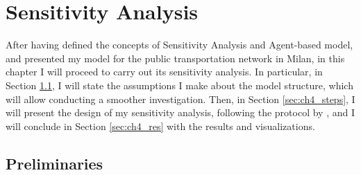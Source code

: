 \chapter{Sensitivity Analysis} \label{ch:sa}


        
After having defined the concepts of Sensitivity Analysis and Agent-based model, and presented my model for the public transportation network in Milan, in this chapter I will proceed to carry out its sensitivity analysis. In particular, in Section \ref{sec:ch4_pre}, I will state the assumptions I make about the model structure, which will allow conducting a smoother investigation. Then, in Section \ref{sec:ch4_steps}, I will present the design of my sensitivity analysis, following the protocol by \textcite{Borgonovo2022SensitivityAO}, and I will conclude in Section \ref{sec:ch4_res} with the results and visualizations.


\section{Preliminaries} \label{sec:ch4_pre}

